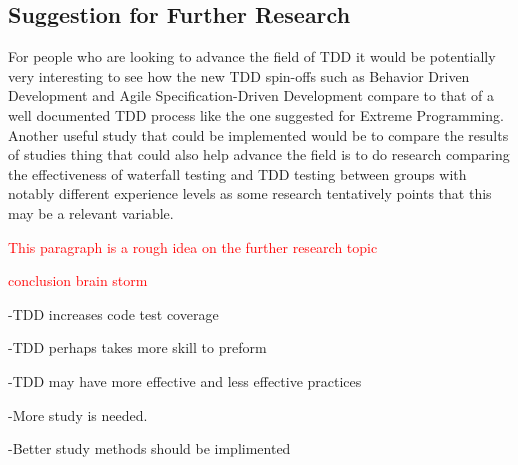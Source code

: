 \documentclass{sig-alternate}
\newcommand{\mycomment}[1]{\textcolor{red}{#1}}
\begin{document}
\subsection{Suggestion for Further Research}
For people who are looking to advance the field of TDD it would be potentially very interesting to see how the new TDD spin-offs such as Behavior Driven Development and Agile Specification-Driven Development compare to that of a well documented TDD process like the one suggested for Extreme Programming.  Another useful study that could be implemented would be to compare the results of studies thing that could also help advance the field is to do research comparing the effectiveness of waterfall testing and TDD testing between groups with notably different experience levels as some research tentatively points that this may be a relevant variable.

\mycomment{This paragraph is a rough idea on the further research topic}

\mycomment{conclusion brain storm}

-TDD increases code test coverage

-TDD perhaps takes more skill to preform

-TDD may have more effective and less effective practices

-More study is needed.

-Better study methods should be implimented


  
\end{document}

